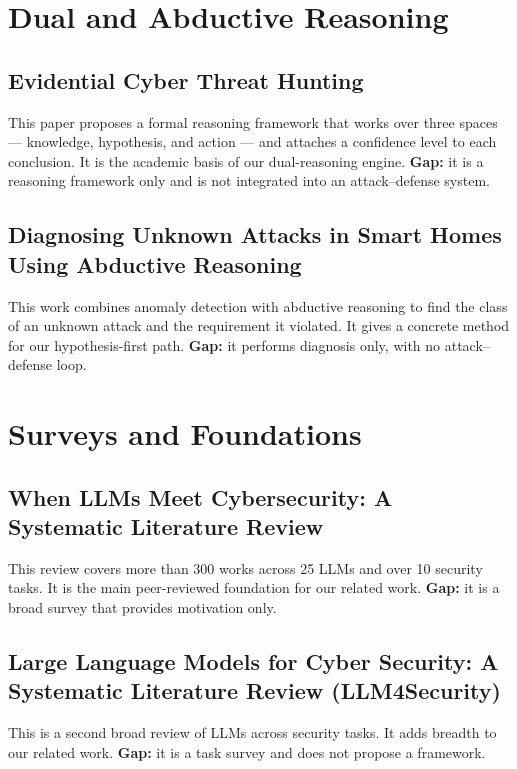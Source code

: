 \section{Dual and Abductive Reasoning}

\subsection{Evidential Cyber Threat Hunting}
This paper proposes a formal reasoning framework that works over three spaces
--- knowledge, hypothesis, and action --- and attaches a confidence level to each
conclusion. It is the academic basis of our dual-reasoning engine. \textbf{Gap:} it
is a reasoning framework only and is not integrated into an attack--defense
system.

\subsection{Diagnosing Unknown Attacks in Smart Homes Using Abductive Reasoning}
This work combines anomaly detection with abductive reasoning to find the class
of an unknown attack and the requirement it violated. It gives a concrete method
for our hypothesis-first path. \textbf{Gap:} it performs diagnosis only, with no
attack--defense loop.

\section{Surveys and Foundations}

\subsection{When LLMs Meet Cybersecurity: A Systematic Literature Review}
This review covers more than 300 works across 25 LLMs and over 10 security tasks.
It is the main peer-reviewed foundation for our related work. \textbf{Gap:} it is
a broad survey that provides motivation only.

\subsection{Large Language Models for Cyber Security: A Systematic Literature Review (LLM4Security)}
This is a second broad review of LLMs across security tasks. It adds breadth to
our related work. \textbf{Gap:} it is a task survey and does not propose a
framework.

